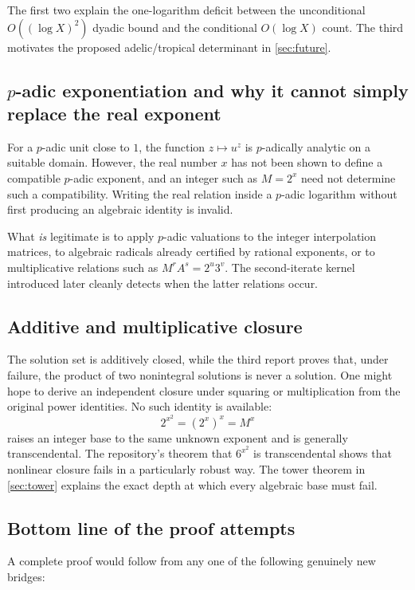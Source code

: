 \documentclass[11pt,oneside]{article}
\theoremstyle{definition}
\theoremstyle{remark}
\begin{document}
The first two explain the one-logarithm deficit between the unconditional $O((\log X)^2)$
dyadic bound and the conditional $O(\log X)$ count.  The third motivates the proposed
adelic/tropical determinant in \cref{sec:future}.

\subsection{\texorpdfstring{$p$-adic}{p-adic} exponentiation and why it cannot simply replace the real exponent}

For a $p$-adic unit close to $1$, the function $z\mapsto u^z$ is $p$-adically analytic on a
suitable domain.  However, the real number $x$ has not been shown to define a compatible
$p$-adic exponent, and an integer such as $M=2^x$ need not determine such a compatibility.
Writing the real relation inside a $p$-adic logarithm without first producing an algebraic
identity is invalid.

What \emph{is} legitimate is to apply $p$-adic valuations to the integer interpolation
matrices, to algebraic radicals already certified by rational exponents, or to multiplicative
relations such as $M^rA^s=2^u3^v$.  The second-iterate kernel introduced later cleanly detects
when the latter relations occur.

\subsection{Additive and multiplicative closure}

The solution set is additively closed, while the third report proves that, under failure, the
product of two nonintegral solutions is never a solution.  One might hope to derive an
independent closure under squaring or multiplication from the original power identities.
No such identity is available:
\[
  2^{x^2}=(2^x)^x=M^x
\]
raises an integer base to the same unknown exponent and is generally transcendental.  The
repository's theorem that $6^{x^2}$ is transcendental shows that nonlinear closure fails in a
particularly robust way.  The tower theorem in \cref{sec:tower} explains the exact depth at
which every algebraic base must fail.

\subsection{Bottom line of the proof attempts}

A complete proof would follow from any one of the following genuinely new bridges:
\end{document}
